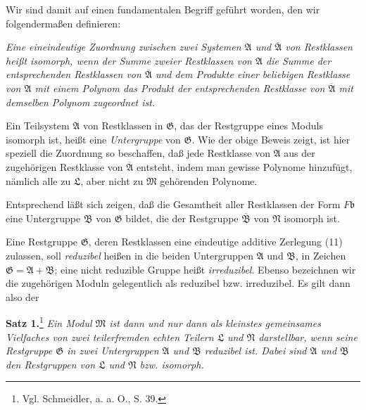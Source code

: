\documentclass[11pt]{article}
\newcommand{\mM}{\mathfrak{M}}
\newcommand{\mN}{\mathfrak{N}}
\newcommand{\mL}{\mathfrak{L}}
\newcommand{\mG}{\mathfrak{G}}
\newcommand{\mA}{\mathfrak{A}}
\newcommand{\mB}{\mathfrak{B}}
\newcommand{\mb}{\mathfrak{b}}
\newcommand{\mbarA}{\overline{\mathfrak{A}}}
\newcommand{\mbarB}{\overline{\mathfrak{B}}}
\begin{document}
Wir sind damit auf einen fundamentalen Begriff geführt worden, den wir folgendermaßen definieren:

\emph{Eine eineindeutige Zuordnung zwischen zwei Systemen $\mA$ und $\mbarA$ von Restklassen heißt isomorph, wenn der Summe zweier Restklassen von $\mA$ die Summe der entsprechenden Restklassen von $\mbarA$ und dem Produkte einer beliebigen Restklasse von $\mA$ mit einem Polynom das Produkt der entsprechenden Restklasse von $\mbarA$ mit demselben Polynom zugeordnet ist.}

Ein Teilsystem $\mA$ von Restklassen in $\mG$, das der Restgruppe eines Moduls isomorph ist, heißt eine \emph{Untergruppe} von $\mG$. Wie der obige Beweis zeigt, ist hier speziell die Zuordnung so beschaffen, daß jede Restklasse von $\mA$ aus der zugehörigen Restklasse von $\mbarA$ entsteht, indem man gewisse Polynome hinzufügt, nämlich alle zu $\mL$, aber nicht zu $\mM$ gehörenden Polynome.

Entsprechend läßt sich zeigen, daß die Gesamtheit aller Restklassen der Form $F\mb$ eine Untergruppe $\mB$ von $\mG$ bildet, die der Restgruppe $\mbarB$ von $\mN$ isomorph ist.

Eine Restgruppe $\mG$, deren Restklassen eine eindeutige additive Zerlegung (11) zulassen, soll \emph{reduzibel} heißen in die beiden Untergruppen $\mA$ und $\mB$, in Zeichen $\mG=\mA+\mB$; eine nicht reduzible Gruppe heißt \emph{irreduzibel}. Ebenso bezeichnen wir die zugehörigen Moduln gelegentlich als reduzibel bzw. irreduzibel. Es gilt dann also der

\textbf{Satz 1.}\footnote{Vgl. Schmeidler, a. a. O., S. 39.} \emph{Ein Modul $\mM$ ist dann und nur dann als kleinstes gemeinsames Vielfaches von zwei teilerfremden echten Teilern $\mL$ und $\mN$ darstellbar, wenn seine Restgruppe $\mG$ in zwei Untergruppen $\mA$ und $\mB$ reduzibel ist. Dabei sind $\mA$ und $\mB$ den Restgruppen von $\mL$ und $\mN$ bzw. isomorph.}
\end{document}
